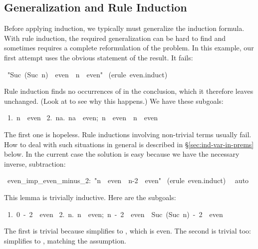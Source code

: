 \subsection{Generalization and Rule Induction}
\label{sec:gen-rule-induction}

%
Before applying induction, we typically must generalize
the induction formula.  With rule induction, the required generalization
can be hard to find and sometimes requires a complete reformulation of the
problem.  In this  example, our first attempt uses the obvious statement of
the result.  It fails:
%
\begin{isabelle}
\ "Suc\ (Suc\ n)\ \isasymin \ even\
\isasymLongrightarrow \ n\ \isasymin \ even"\isanewline
{}\ (erule\ even.induct)\isanewline
{}
\end{isabelle}
%
Rule induction finds no occurrences of  in the
conclusion, which it therefore leaves unchanged.  (Look at
 to see why this happens.)  We have these subgoals:
\begin{isabelle}
\ 1.\ n\ \isasymin \ even\isanewline
\ 2.\ \isasymAnd na.\ \isasymlbrakk na\ \isasymin \ even;\ n\ \isasymin \ even\isasymrbrakk \ \isasymLongrightarrow \ n\ \isasymin \ even%
\end{isabelle}
The first one is hopeless.  Rule inductions involving
non-trivial terms usually fail.  How to deal with such situations
in general is described in {\S}\ref{sec:ind-var-in-prems} below.
In the current case the solution is easy because
we have the necessary inverse, subtraction:
\begin{isabelle}
\ even_imp_even_minus_2:\ "n\ \isasymin \ even\ \isasymLongrightarrow \ n-2\ \isasymin \ even"\isanewline
{}\ (erule\ even.induct)\isanewline
\ \isacommand{apply}\ auto\isanewline
{}
\end{isabelle}
%
This lemma is trivially inductive.  Here are the subgoals:
\begin{isabelle}
\ 1.\ 0\ -\ 2\ \isasymin \ even\isanewline
\ 2.\ \isasymAnd n.\ \isasymlbrakk n\ \isasymin \ even;\ n\ -\ 2\ \isasymin \ even\isasymrbrakk \ \isasymLongrightarrow \ Suc\ (Suc\ n)\ -\ 2\ \isasymin \ even%
\end{isabelle}
The first is trivial because  simplifies to , which is
even.  The second is trivial too: \isa{Suc\ (Suc\ n)\ -\ 2} simplifies to
\isa{n}, matching the assumption.%

